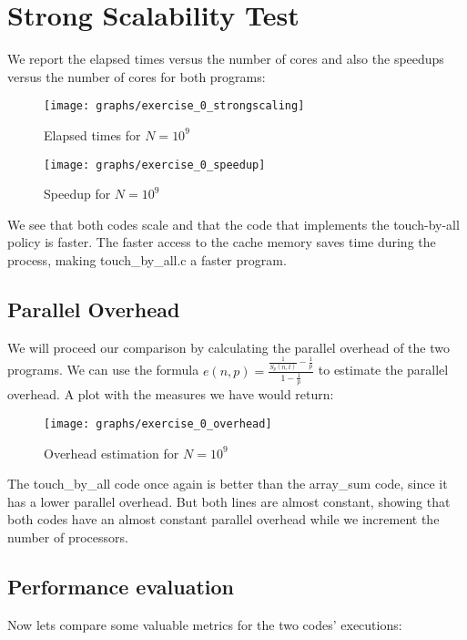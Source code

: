\documentclass{article}
\begin{document}
\section{Strong Scalability Test}
We report the elapsed times versus the number of cores and also the speedups versus the number of cores for both programs:

\begin{figure}[H] %
	\centering
	\texttt{[image: graphs/exercise\_0\_strongscaling]} %
	\caption{Elapsed times for $N=10^9$}
\end{figure}

\begin{figure}[H] %
	\centering
	\texttt{[image: graphs/exercise\_0\_speedup]} %
	\caption{Speedup for $N=10^9$}
\end{figure}


We see that both codes scale and that the code that implements the touch-by-all policy is faster. The faster access to the cache memory saves time during the process, making touch\_by\_all.c a faster program.

\subsection{Parallel Overhead}
We will proceed our comparison by calculating the parallel overhead of the two programs. We can use the formula $ e(n,p) =\frac{\frac{1}{S_p(n,t)}-\frac{1}{p}}{1-\frac{1}{p}}$ to estimate the parallel overhead.  A plot with the measures we have would return:

\begin{figure}[H] %
	\centering
	\texttt{[image: graphs/exercise\_0\_overhead]} %
	\caption{Overhead estimation for $N=10^9$}
\end{figure}
The touch\_by\_all code once again is better than the array\_sum code, since it has a lower parallel overhead.
But both lines are almost constant, showing that both codes have an almost constant parallel overhead while we increment the number of processors.

\subsection{Performance evaluation}
Now lets compare some valuable metrics for the two codes' executions:
\end{document}
